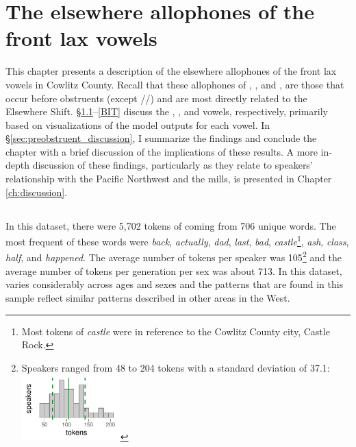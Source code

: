 \chapter{The elsewhere allophones of the front lax vowels}
\label{ch:elsewhere_shift}

This chapter presents a description of the elsewhere allophones of the front lax vowels in Cowlitz County. Recall that these allophones of \trap, \dress, and \kit, are those that occur before obstruents (except //) and are most directly related to the Elsewhere Shift. \S\ref{BAT}--\ref{BIT} discuss the \bat, \bet, and \bit vowels, respectively, primarily based on visualizations of the model outputs for each vowel. In \S\ref{sec:preobstruent_discussion}, I summarize the findings and conclude the chapter with a brief discussion of the implications of these results. A more in-depth discussion of these findings, particularly as they relate to speakers' relationship with the Pacific Northwest and the mills, is presented in Chapter \ref{ch:discussion}.


\section{\bat}
\label{BAT}

In this dataset, there were 5,702 tokens of \bat coming from 706 unique words. The most frequent of these words were \textit{back}, \textit{actually}, \textit{dad}, \textit{last}, \textit{bad}, \textit{castle}\footnote{Most tokens of \textit{castle} were in reference to the Cowlitz County city, Castle Rock.}, \textit{ash}, \textit{class}, \textit{half}, and \textit{happened}. The average number of tokens per speaker was 105\footnote{Speakers ranged from 48 to 204 tokens with a standard deviation of 37.1: \includegraphics[width = 1.5in]{Figures/BAT/BAT_tiny.pdf}} and the average number of tokens per generation per sex was about 713. In this dataset, \bat varies considerably across ages and sexes and the patterns that are found in this sample reflect similar patterns described in other areas in the West.

